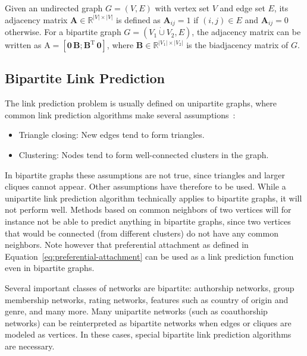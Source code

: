 \documentclass[11pt,a4paper]{book}
\newcommand{\dunion}{\mathbin{\dot\cup}} %
\begin{document}
Given an undirected graph $G=(V,E)$ with vertex set $V$ and edge set
$E$, its adjacency matrix $\mathbf A\in \mathbb R^{|V| \times |V|}$ is
defined as $\mathbf A_{ij}=1$ if $(i,j)\in E$ and $\mathbf A_{ij}=0$
otherwise.  For a bipartite graph $G=(V_1 \dunion V_2, E)$, the adjacency matrix
can be written as A$= \left[ \mathbf 0 \, \mathbf B; \mathbf B^{\mathrm
    T} \, \mathbf 0 \right] $,
where $\mathbf B \in \mathbb R^{|V_1| \times |V_2|}$ is the biadjacency matrix
of $G$.

\subsection{Bipartite Link Prediction}
\label{sec:bipartite:bipartite-link-prediction}
The link prediction problem is usually defined on unipartite graphs, where
common link prediction algorithms make several assumptions~\cite{b461}:  
\begin{itemize}
\item Triangle closing:  New edges tend to form triangles. 
\item Clustering: Nodes tend to form well-connected clusters in
  the graph.   
\end{itemize}
In bipartite graphs these assumptions are not true, since triangles and
larger cliques cannot appear.  Other assumptions have therefore to be
used.  While a unipartite link prediction algorithm technically applies
to bipartite graphs, it will not perform well.  Methods based on common
neighbors of two vertices will for instance not be able to predict
anything in bipartite graphs, since two vertices that would be connected
(from different clusters) do not have any common neighbors.
Note however that preferential attachment as defined in
Equation~\ref{eq:preferential-attachment} can be used as a link
prediction function even in bipartite graphs. 

Several important classes of networks are bipartite: authorship
networks, group membership networks, rating networks, features such as
country of origin and genre, and many more.
Many unipartite networks (such as coauthorship networks) can be
reinterpreted as bipartite networks when edges or cliques are modeled as
vertices.  In these cases, special bipartite link prediction
algorithms are necessary.  
\end{document}
